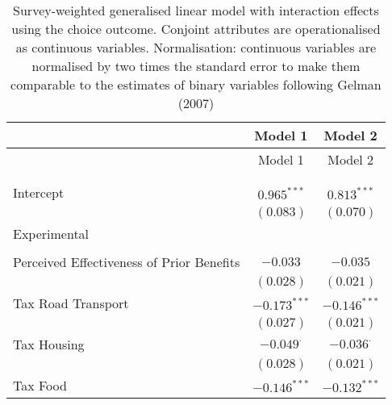 
\begin{center}
\begin{tiny}
\begin{longtable}{l@{} c@{} c@{}}
\hline
 & Model 1 & Model 2 \\
\hline
\endfirsthead
\hline
 & Model 1 & Model 2 \\
\hline
\endhead
\hline
\endfoot
\hline
\multicolumn{3}{l}{\tiny{$^{***}p<0.001$; $^{**}p<0.01$; $^{*}p<0.05$; $^{\cdot}p<0.1$}}\\
\caption{Survey-weighted generalised linear model with interaction effects using the choice outcome. Conjoint attributes are operationalised as continuous variables. Normalisation: continuous variables are normalised by two times 
               the standard error to make them comparable to the estimates of binary variables following Gelman (2007)}
\label{table:weighted_interactions_exp_continous_choice}
\endlastfoot \\
Intercept                                                                  & $0.965^{***}$    & $0.813^{***}$    \\
                                                                           & $(0.083)$        & $(0.070)$        \\
Experimental                                                               &                  &                  \\
                                                                           &                  &                  \\
\quad Perceived Effectiveness of Prior Benefits                            & $-0.033$         & $-0.035$         \\
                                                                           & $(0.028)$        & $(0.021)$        \\
\quad Tax Road Transport                                                   & $-0.173^{***}$   & $-0.146^{***}$   \\
                                                                           & $(0.027)$        & $(0.021)$        \\
\quad Tax Housing                                                          & $-0.049^{\cdot}$ & $-0.036^{\cdot}$ \\
                                                                           & $(0.028)$        & $(0.021)$        \\
\quad Tax Food                                                             & $-0.146^{***}$   & $-0.132^{***}$   \\

\end{longtable}
\end{tiny}
\end{center}
